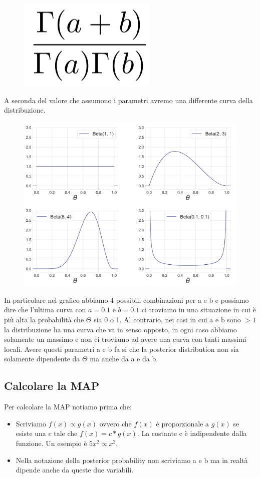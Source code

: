 \documentclass[14pt]{extreport}
\begin{document}
\begin{figure}[H]
\centering
\includegraphics[width=0.17\linewidth]{35.jpeg}
\end{figure}

A seconda del valore che assumono i parametri avremo una differente curva della distribuzione.
\begin{figure}[H]
\centering
\includegraphics[width=0.7\linewidth]{36.jpeg}
\end{figure}

In particolare nel grafico abbiamo 4 possibili combinazioni per a e b e possiamo dire che l'ultima curva con $a=0.1$ e $b=0.1$ ci troviamo in una
situazione in cui è più alta la probabilità che $\Theta$ sia 0 o 1. Al contrario, nei casi in cui a e b sono $> 1$ la distribuzione ha una curva che
va in senso opposto, in ogni caso abbiamo solamente un massimo e non ci troviamo ad avere una curva con tanti massimi locali. Avere questi parametri a
e b fa si che la posterior distribution non sia solamente dipendente da $\Theta$ ma anche da a e da b.

\subsection{Calcolare la MAP}


Per calcolare la MAP notiamo prima che:
\begin{itemize}


\item Scriviamo $f(x) \propto g(x)$ ovvero che $f(x)$ è proporzionale a $g(x)$ se esiste una $c$ tale che $f(x) = c*g(x)$. La costante c è
indipendente dalla funzione. Un esempio è $5x^2 \propto x^2$.
\item Nella notazione della posterior probability non scriviamo a e b ma in realtà dipende anche da queste due variabili.
\end{itemize}
\end{document}
